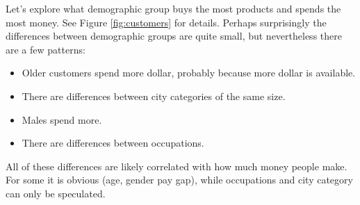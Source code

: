 \documentclass{article}
\begin{document}
Let's explore what demographic group buys the most products and spends the most money. See Figure \ref{fig:customers} for details. Perhaps surprisingly the differences between demographic groups are quite small, but nevertheless there are a few patterns:

\begin{itemize}
\item Older customers spend more dollar, probably because more dollar is available.
\item There are differences between city categories of the same size.
\item Males spend more.
\item There are differences between occupations.
\end{itemize}

All of these differences are likely correlated with how much money people make. For some it is obvious (age, gender pay gap), while occupations and city category can only be speculated.
\end{document}
